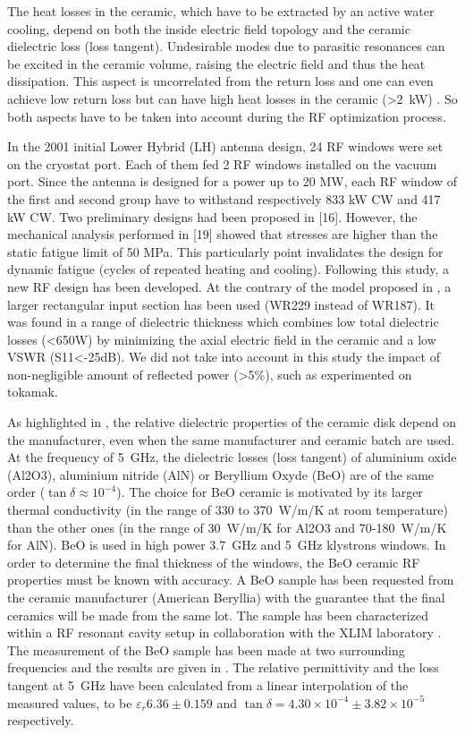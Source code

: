 The heat losses in the ceramic, which have to be extracted by an active water cooling, depend on both the inside electric field topology and the ceramic dielectric loss (loss tangent). Undesirable modes due to parasitic resonances can be excited in the ceramic volume, raising the electric field and thus the heat dissipation. This aspect is uncorrelated from the return loss and one can even achieve low return loss but can have high heat losses in the ceramic (>2~\si{kW}) . So both aspects have to be taken into account during the RF optimization process.

In the 2001 initial Lower Hybrid (LH) antenna design, 24 RF windows were set on the cryostat port. Each of them fed 2 RF windows installed on the vacuum port. Since the antenna is designed for a power up to 20 MW, each RF window of the first and second group have to withstand respectively 833 kW CW and 417 kW CW. Two preliminary designs had been proposed in [16]. However, the mechanical analysis performed in [19] showed that stresses are higher than the static fatigue limit of 50 MPa. This particularly point invalidates the design for dynamic fatigue (cycles of repeated heating and cooling). Following this study, a new RF design has been developed. At the contrary of the model proposed in , a larger rectangular input section has been used (WR229 instead of WR187). It was found in  a range of dielectric thickness which combines low total dielectric losses (<650W) by minimizing the axial electric field in the ceramic and a low VSWR (S11<-25dB). We did not take into account in this study the impact of non-negligible amount of reflected power (>5\%), such as experimented on tokamak.

As highlighted in , the relative dielectric properties of the ceramic disk depend on the manufacturer, even when the same manufacturer and ceramic batch are used. At the frequency of 5~GHz, the dielectric losses (loss tangent) of aluminium oxide (Al2O3), aluminium nitride (AlN) or Beryllium Oxyde (BeO) are of the same order ($\tan\delta \approx 10^{-4}$). The choice for BeO ceramic is motivated by its larger thermal conductivity (in the range of 330 to 370~\si{W/m/K} at room temperature) than the other ones (in the range of 30~\si{W/m/K} for Al2O3 and 70-180~\si{W/m/K} for AlN). BeO is used in high power 3.7~GHz and 5~GHz klystrons windows. In order to determine the final thickness of the windows, the BeO ceramic RF properties must be known with accuracy. A BeO sample has been requested from the ceramic manufacturer (American Beryllia) with the guarantee that the final ceramics will be made from the same lot. The sample has been characterized within a RF resonant cavity setup in collaboration with the XLIM laboratory . The measurement of the BeO sample has been made at two surrounding frequencies and the results are given in \cite{hillairet2015}. The relative permittivity and the loss tangent at 5~GHz have been calculated from a linear interpolation of the measured values, to be $\varepsilon_{r}6.36\pm0.159$ and $\tan \delta = 4.30\times 10^{-4}\pm3.82\times 10^{-5}$ respectively. 


